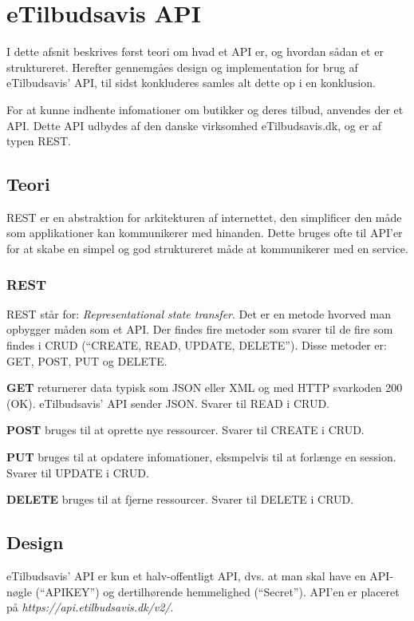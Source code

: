 \section{eTilbudsavis API}\label{api}
I dette afsnit beskrives først teori om hvad et API er, og hvordan sådan et er struktureret.
Herefter gennemgåes design og implementation for brug af eTilbudsavis' API, til sidst konkluderes samles alt dette op i en konklusion.

For at kunne indhente infomationer om butikker og deres tilbud, anvendes der et API.
Dette API udbydes af den danske virksomhed eTilbudsavis.dk, og er af typen REST.

\subsection{Teori}
REST er en abstraktion for arkitekturen af internettet, den simplificer den måde som applikationer kan kommunikerer med hinanden.
Dette bruges ofte til API'er for at skabe en simpel og god struktureret måde at kommunikerer med en service\citep{REST}.

\subsubsection{REST}
REST står for: \textit{Representational state transfer}.
Det er en metode hvorved man opbygger måden som et API.
Der findes fire metoder som svarer til de fire som findes i CRUD (``CREATE, READ, UPDATE, DELETE'').
Disse metoder er: GET, POST, PUT og DELETE.

\textbf{GET}
returnerer data typisk som JSON eller XML og med HTTP svarkoden 200 (OK).
eTilbudsavis' API sender JSON.
Svarer til READ i CRUD.

\textbf{POST}
bruges til at oprette nye ressourcer.
Svarer til CREATE i CRUD.

\textbf{PUT}
bruges til at opdatere infomationer, eksmpelvis til at forlænge en session.
Svarer til UPDATE i CRUD.

\textbf{DELETE}
bruges til at fjerne ressourcer.
Svarer til DELETE i CRUD.

\subsection{Design}
eTilbudsavis' API er kun et halv-offentligt API, dvs. at man skal have en API-nøgle (``APIKEY'') og dertilhørende hemmelighed (``Secret'').
API'en er placeret på \textit{https://api.etilbudsavis.dk/v2/}. \citep{eTilAPI}

